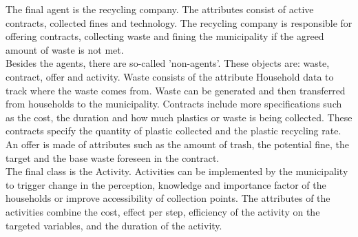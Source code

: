 \noindent The final agent is the recycling company. The attributes consist of active contracts, collected fines and technology. The recycling company is responsible for offering contracts, collecting waste and fining the municipality if the agreed amount of waste is not met.\\

\noindent Besides the agents, there are so-called 'non-agents'. These objects are: waste, contract, offer and activity.
\noindent Waste consists of the attribute Household data to track where the waste comes from. Waste can be generated and then transferred from households to the municipality. Contracts include more specifications such as the cost, the duration and how much plastics or waste is being collected. These contracts specify the quantity of plastic collected and the plastic recycling rate.\\

\noindent An offer is made of attributes such as the amount of trash, the potential fine, the target and the base waste foreseen in the contract.\\

\noindent The final class is the Activity. Activities can be implemented by the municipality to trigger change in the perception, knowledge and importance factor of the households or improve accessibility of collection points. The attributes of the activities combine the cost, effect per step, efficiency of the activity on the targeted variables, and the duration of the activity.

